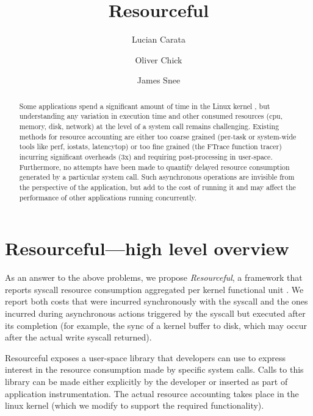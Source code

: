\documentclass[12pt]{article}
\title{Resourceful}
\author{Lucian Carata \and Oliver Chick \and James Snee}
\date{}
\begin{document}
\maketitle{}

\begin{abstract}
Some applications spend a significant amount of time in the Linux kernel \cite{kernelscale}, but understanding any variation in execution time and other consumed resources (cpu, memory, disk, network) at the level of a system call remains challenging.
Existing methods for resource accounting are either too coarse grained (per-task or system-wide tools like perf, iostats, latencytop) or too fine grained (the FTrace function tracer) incurring significant overheads (3x) and requiring post-processing in user-space.
Furthermore, no attempts have been made to quantify delayed resource consumption generated by a particular system call. Such asynchronous operations are invisible from the perspective of the application, but add to the cost of running it and may affect the performance of other applications running concurrently.
\end{abstract}

\section{Resourceful---high level overview}
  As an answer to the above problems, we propose \emph{Resourceful}, a framework that reports syscall resource consumption aggregated per kernel functional unit \cite{kernelmap}. We report both costs that were incurred synchronously with the syscall and the ones incurred during asynchronous actions triggered by the syscall but executed after its completion (for example, the sync of a kernel buffer to disk, which may occur after the actual write syscall returned).

Resourceful exposes a user-space library that developers can use to express interest in the resource consumption made by specific system calls. Calls to this library can be made either explicitly by the developer or inserted as part of application instrumentation. The actual resource accounting takes place in the linux kernel (which we modify to support the required functionality).
\end{document}
